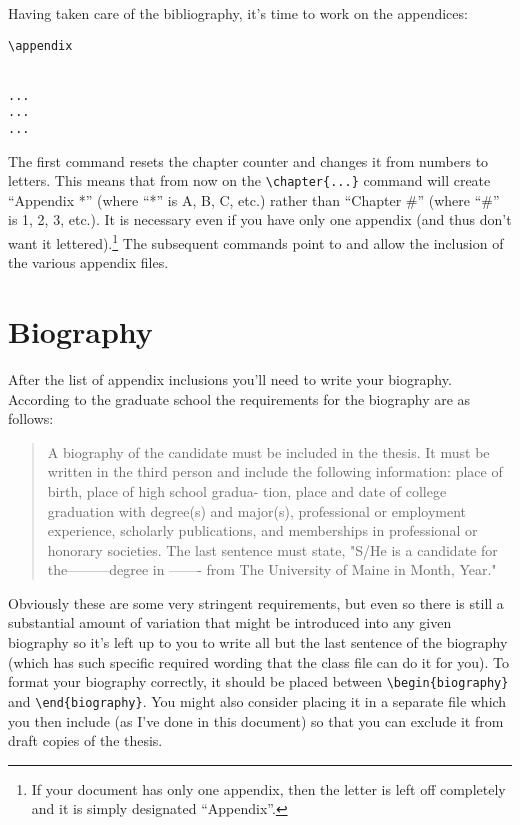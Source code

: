 Having taken care of the bibliography, it's time to work on the appendices:

\begin{verbatim}
\appendix


...
...
...
\end{verbatim}

The first command resets the chapter counter and changes it from numbers to letters.  This means that from now on the \verb=\chapter{...}= command will create ``Appendix *'' (where ``*'' is A, B, C, etc.) rather than ``Chapter \#'' (where ``\#'' is 1, 2, 3, etc.).  It is necessary even if you have only one appendix (and thus don't want it lettered).\footnote{If your document has only one appendix, then the letter is left off completely and it is simply designated ``Appendix''.}  The subsequent commands point to and allow the inclusion of the various appendix files.

\section{Biography}\label{bio}
After the list of appendix inclusions you'll need to write your biography.  According to the graduate school the requirements for the biography are as follows:
\begin{quote}
A biography of the candidate must be included in the thesis.  It must  be written in the 
third person and include the following information:  place of birth, place of high school gradua- 
tion, place and date of college graduation with degree(s) and major(s), professional or 
employment experience, scholarly publications, and memberships in professional or honorary 
societies.  The last sentence must state, "S/He is a candidate for the---------degree in ------- from 
The University of Maine in Month, Year."
\end{quote}
Obviously these are some very stringent requirements, but even so there is still a substantial amount of variation that might be introduced into any given biography so it's left up to you to write all but the last sentence of the biography (which has such specific required wording that the class file can do it for you).  To format your biography correctly, it should be placed between \verb=\begin{biography}= and \verb=\end{biography}=.  You might also consider placing it in a separate file which you then include (as I've done in this document) so that you can exclude it from draft copies of the thesis.

